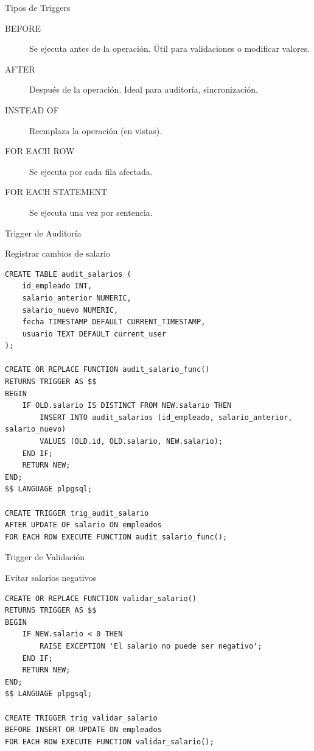 \documentclass[aspectratio=169, 10pt, xcolor=table]{beamer}
\begin{document}
\begin{frame}{Tipos de Triggers}
    \begin{description}
        \item[BEFORE] Se ejecuta antes de la operación. Útil para validaciones o modificar valores.
        \item[AFTER] Después de la operación. Ideal para auditoría, sincronización.
        \item[INSTEAD OF] Reemplaza la operación (en vistas).
    \end{description}
    \vspace{0.3cm}
    \begin{description}
        \item[FOR EACH ROW] Se ejecuta por cada fila afectada.
        \item[FOR EACH STATEMENT] Se ejecuta una vez por sentencia.
    \end{description}
\end{frame}

\begin{frame}[fragile]{Trigger de Auditoría}
    \begin{block}{Registrar cambios de salario}
        \begin{lstlisting}
CREATE TABLE audit_salarios (
    id_empleado INT,
    salario_anterior NUMERIC,
    salario_nuevo NUMERIC,
    fecha TIMESTAMP DEFAULT CURRENT_TIMESTAMP,
    usuario TEXT DEFAULT current_user
);

CREATE OR REPLACE FUNCTION audit_salario_func()
RETURNS TRIGGER AS $$
BEGIN
    IF OLD.salario IS DISTINCT FROM NEW.salario THEN
        INSERT INTO audit_salarios (id_empleado, salario_anterior, salario_nuevo)
        VALUES (OLD.id, OLD.salario, NEW.salario);
    END IF;
    RETURN NEW;
END;
$$ LANGUAGE plpgsql;

CREATE TRIGGER trig_audit_salario
AFTER UPDATE OF salario ON empleados
FOR EACH ROW EXECUTE FUNCTION audit_salario_func();
        \end{lstlisting}
    \end{block}
\end{frame}

\begin{frame}[fragile]{Trigger de Validación}
    \begin{block}{Evitar salarios negativos}
        \begin{lstlisting}
CREATE OR REPLACE FUNCTION validar_salario()
RETURNS TRIGGER AS $$
BEGIN
    IF NEW.salario < 0 THEN
        RAISE EXCEPTION 'El salario no puede ser negativo';
    END IF;
    RETURN NEW;
END;
$$ LANGUAGE plpgsql;

CREATE TRIGGER trig_validar_salario
BEFORE INSERT OR UPDATE ON empleados
FOR EACH ROW EXECUTE FUNCTION validar_salario();
        \end{lstlisting}
    \end{block}
\end{frame}
\end{document}
